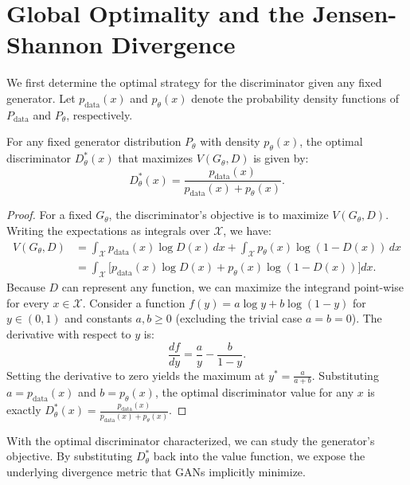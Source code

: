 \section{Global Optimality and the Jensen-Shannon Divergence}

We first determine the optimal strategy for the discriminator given any fixed generator. Let $p_{\text{data}}(x)$ and $p_\theta(x)$ denote the probability density functions of $P_{\text{data}}$ and $P_\theta$, respectively.

\begin{theorem}
\label{thm:optimal_d}
For any fixed generator distribution $P_\theta$ with density $p_\theta(x)$, the optimal discriminator $D^*_\theta(x)$ that maximizes $V(G_\theta, D)$ is given by:
\begin{equation}
    D^*_\theta(x) = \frac{p_{\text{data}}(x)}{p_{\text{data}}(x) + p_\theta(x)}.
\end{equation}
\end{theorem}

\begin{proof}
For a fixed $G_\theta$, the discriminator's objective is to maximize $V(G_\theta, D)$. Writing the expectations as integrals over $\mathcal{X}$, we have:
\begin{align*}
    V(G_\theta, D) &= \int_{\mathcal{X}} p_{\text{data}}(x) \log D(x) \, dx + \int_{\mathcal{X}} p_\theta(x) \log (1 - D(x)) \, dx \\
    &= \int_{\mathcal{X}} \Big[ p_{\text{data}}(x) \log D(x) + p_\theta(x) \log (1 - D(x)) \Big] dx.
\end{align*}
Because $D$ can represent any function, we can maximize the integrand point-wise for every $x \in \mathcal{X}$. Consider a function $f(y) = a \log y + b \log (1 - y)$ for $y \in (0, 1)$ and constants $a, b \ge 0$ (excluding the trivial case $a=b=0$). The derivative with respect to $y$ is:
\begin{equation}
    \frac{df}{dy} = \frac{a}{y} - \frac{b}{1 - y}.
\end{equation}
Setting the derivative to zero yields the maximum at $y^* = \frac{a}{a + b}$. Substituting $a = p_{\text{data}}(x)$ and $b = p_\theta(x)$, the optimal discriminator value for any $x$ is exactly $D^*_\theta(x) = \frac{p_{\text{data}}(x)}{p_{\text{data}}(x) + p_\theta(x)}$. 
\end{proof}

With the optimal discriminator characterized, we can study the generator's objective. By substituting $D^*_\theta$ back into the value function, we expose the underlying divergence metric that GANs implicitly minimize.

